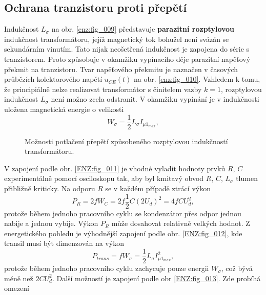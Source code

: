   \subsection{Ochrana tranzistoru proti přepětí}
    Indukčnost \(L_\sigma\) na obr. \ref{enz:fig_009} představuje \textbf{parazitní rozptylovou} 
    indukčnost transformátoru, jejíž magnetický tok bohužel není svázán se sekundárním vinutím. 
    Tato nijak neošetřená indukčnost je zapojena do série s tranzistorem. Proto způsobuje v 
    okamžiku vypínacího děje parazitní napěťový překmit na tranzistoru. Tvar napěťového překmitu 
    je naznačen v časových průbězích kolektorového napětí \(u_{CE}(t)\) na obr. 
    \ref{enz:fig_010}. Vzhledem k tomu, že principiálně nelze realizovat transformátor s 
    činitelem vazby \(k = 1\), rozptylovou indukčnost \(L_\sigma\) není možno zcela odstranit. V 
    okamžiku vypínání je v indukčnosti uložena magnetická energie o velikosti
    \begin{equation}\label{ENZ:eq_031}
      W_\sigma = \frac{1}{2}L_\sigma I_{\mu1_{max}},
    \end{equation}
    \begin{figure}[ht!]
      \centering  
      \caption{Možnosti potlačení přepětí způsobeného rozptylovou indukčností transformátoru.}
    \end{figure}
    V zapojení podle obr. \ref{ENZ:fig_011} je vhodné vyladit hodnoty prvků \(R\), \(C\) 
    experimentálně 
    pomocí osciloskopu tak, aby byl kmitavý obvod \(R\), \(C\), \(L_\sigma\) tlumen přibližně 
    kriticky. Na odporu \(R\) se v každém případě ztrácí výkon
    \begin{equation}\label{ENZ:eq_032}
      P_R = 2fW_C = 2f\frac{1}{2}C(2U_d)^2 = 4fCU_d^2,
    \end{equation}
    protože během jednoho pracovního cyklu se kondenzátor přes odpor jednou nabije a jednou 
    vybije. Výkon \(P_R\) může dosahovat relativně velkých hodnot. Z energetického pohledu je 
    výhodnější zapojení podle obr. \ref{ENZ:fig_012}, kde transil musí být dimenzován na výkon
    \begin{equation}\label{ENZ:eq_033}
      P_{trans} = fW_\sigma = \frac{1}{2}L_\sigma I_{\mu1_{max}}^2,
    \end{equation}
    protože během jednoho pracovního cyklu zachycuje pouze energii \(W_\sigma\), což bývá méně 
    než \(2CU_d^2\). Další možností je zapojení podle obr \ref{ENZ:fig_013}. Zde probíhá omezení 
